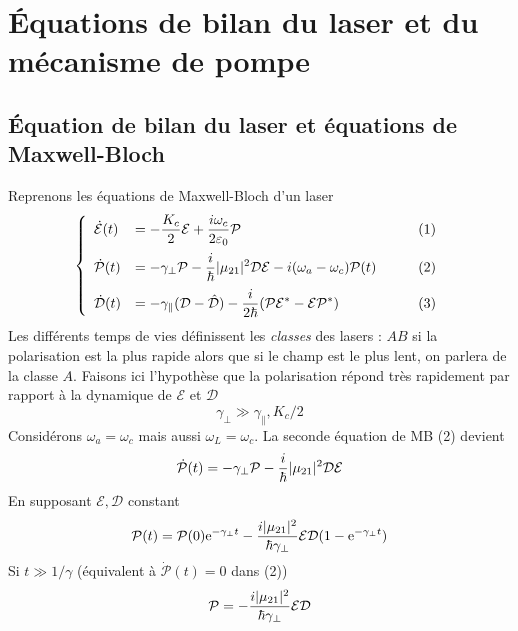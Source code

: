 \chapter{Équations de bilan du laser et du mécanisme de pompe}
\section{Équation de bilan du laser et équations de Maxwell-Bloch}
Reprenons les équations de Maxwell-Bloch d'un laser
\begin{equation}
\left\{\begin{array}{lll}
\dot {\cal E}(t) &\DS=  - \frac{{{K_c}}}{2}{\cal E} + \frac{{i{\omega _c}}}{{2{\varepsilon _0}}}{\cal P}&\qquad(1)\vspace{2mm}\\
\dot {\cal P}(t) &\DS=  - {\gamma _ \bot }{\cal P} - \frac{i}{\hbar }|{\mu _{21}}{|^2}{\cal D}{\cal E} - i({\omega _a} - {\omega _c}){\cal P}(t)&\qquad(2)\vspace{2mm}\\
\dot {\cal D}(t) &\DS=  - {\gamma _\parallel }({{\cal D}} - {\hat {\cal D}}) - \frac{i}{{2\hbar }}({\cal P}{{\cal E}^*} - {\cal E}{{\cal P}^*})&\qquad(3)
\end{array}\right.
\end{equation}
Les différents temps de vies définissent les \textit{classes} des lasers : $AB$ si la polarisation 
est la plus rapide alors que si le champ est le plus lent, on parlera de la classe $A$. Faisons ici 
l'hypothèse que la polarisation répond très rapidement par rapport à la dynamique de $\mathcal{E}$ 
et $\mathcal{D}$
\begin{equation}
{\gamma _ \bot } \gg {\gamma _\parallel },{K_c}/2
\end{equation}
Considérons $\omega_a=\omega_c$ mais aussi $\omega_L=\omega_c$. La seconde équation de MB (2) devient
\begin{equation}
\dot {\cal P}(t) =  - {\gamma _ \bot }{\cal P} - \frac{i}{\hbar }|{\mu _{21}}{|^2}{\cal D}{\cal E}
\end{equation}
En supposant $\mathcal{E}, \mathcal{D}$ constant
\begin{equation}
{\cal P}(t) = {\cal P}(0){{\rm{e}}^{ - {\gamma _ \bot }t}} - \frac{{i|{\mu _{21}}{|^2}}}{{\hbar {\gamma _ \bot }}}{\cal E}{\cal D}(1 - {{\rm{e}}^{ - {\gamma _ \bot }t}})
\end{equation}
Si $t\gg 1/\gamma$ (équivalent à $\dot{\mathcal{P}}(t)=0$ dans (2)) 
\begin{equation}
{\cal P} =  - \frac{{i|{\mu _{21}}{|^2}}}{{\hbar {\gamma _ \bot }}}{\cal E}{\cal D}
\end{equation}
